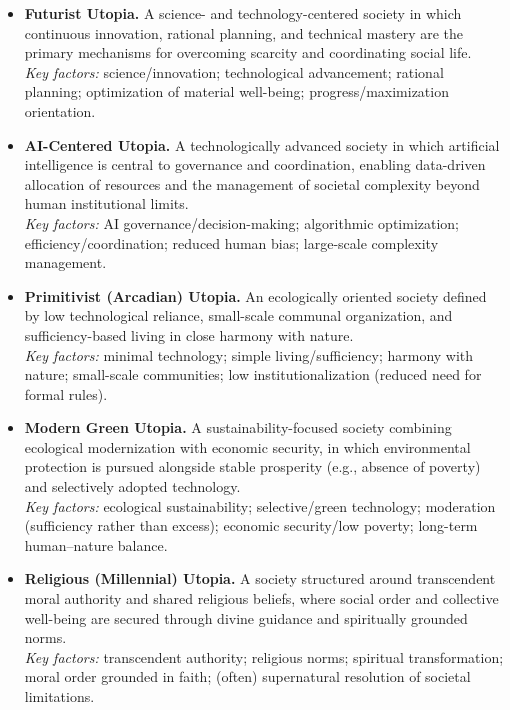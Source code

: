 \documentclass[jou,floatsintext]{apa7}
\begin{document}
\begin{itemize}
    \item \textbf{Futurist Utopia.}  
    A science- and technology-centered society in which continuous innovation, rational planning, and technical mastery are the primary mechanisms for overcoming scarcity and coordinating social life. \\
    \textit{Key factors:} science/innovation; technological advancement; rational planning; optimization of material well-being; progress/maximization orientation.

    \item \textbf{AI-Centered Utopia.}  
    A technologically advanced society in which artificial intelligence is central to governance and coordination, enabling data-driven allocation of resources and the management of societal complexity beyond human institutional limits. \\
    \textit{Key factors:} AI governance/decision-making; algorithmic optimization; efficiency/coordination; reduced human bias; large-scale complexity management.

    \item \textbf{Primitivist (Arcadian) Utopia.}  
    An ecologically oriented society defined by low technological reliance, small-scale communal organization, and sufficiency-based living in close harmony with nature. \\
    \textit{Key factors:} minimal technology; simple living/sufficiency; harmony with nature; small-scale communities; low institutionalization (reduced need for formal rules).

    \item \textbf{Modern Green Utopia.}  
    A sustainability-focused society combining ecological modernization with economic security, in which environmental protection is pursued alongside stable prosperity (e.g., absence of poverty) and selectively adopted technology. \\
    \textit{Key factors:} ecological sustainability; selective/green technology; moderation (sufficiency rather than excess); economic security/low poverty; long-term human--nature balance.

    \item \textbf{Religious (Millennial) Utopia.}  
    A society structured around transcendent moral authority and shared religious beliefs, where social order and collective well-being are secured through divine guidance and spiritually grounded norms. \\
    \textit{Key factors:} transcendent authority; religious norms; spiritual transformation; moral order grounded in faith; (often) supernatural resolution of societal limitations.


\end{itemize}
\end{document}
